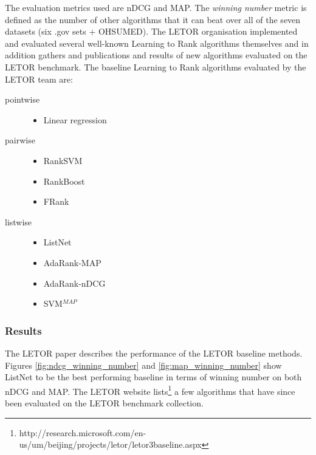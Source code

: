 The evaluation metrics used are \ac{nDCG} and \ac{MAP}. The \emph{winning number} metric is defined as the number of other algorithms that it can beat over all of the seven datasets (six .gov sets + OHSUMED). The LETOR organisation implemented and evaluated several well-known Learning to Rank algorithms themselves and in addition gathers and publications and results of new algorithms evaluated on the LETOR benchmark. The baseline Learning to Rank algorithms evaluated by the LETOR team are:
\begin{description}
\item[pointwise]{\leavevmode
	\begin{itemize}
	\item Linear regression
	\end{itemize}}
\item[pairwise]{\leavevmode
	\begin{itemize}
	\item Rank\ac{SVM} \cite{Herbrich1999,Joachims2002}
	\item RankBoost \cite{Freund2003}
	\item FRank \cite{Tsai2007}
	\end{itemize}}
\item[listwise]{\leavevmode
	\begin{itemize}
	\item ListNet \cite{Cao2007}
	\item AdaRank-MAP \cite{Xu2007}
	\item AdaRank-nDCG \cite{Xu2007}
	\item \ac{SVM}$^{MAP}$ \cite{Yue2007} 
	\end{itemize}}
\end{description} 

\subsubsection{Results}
The LETOR paper \cite{Qin2010} describes the performance of the LETOR baseline methods. Figures \ref{fig:ndcg_winning_number} and \ref{fig:map_winning_number} show ListNet to be the best performing baseline in terms of winning number on both \ac{nDCG} and \ac{MAP}. The LETOR website lists\footnote{http://research.microsoft.com/en-us/um/beijing/projects/letor/letor3baseline.aspx} a few algorithms that have since been evaluated on the LETOR benchmark collection.\\

